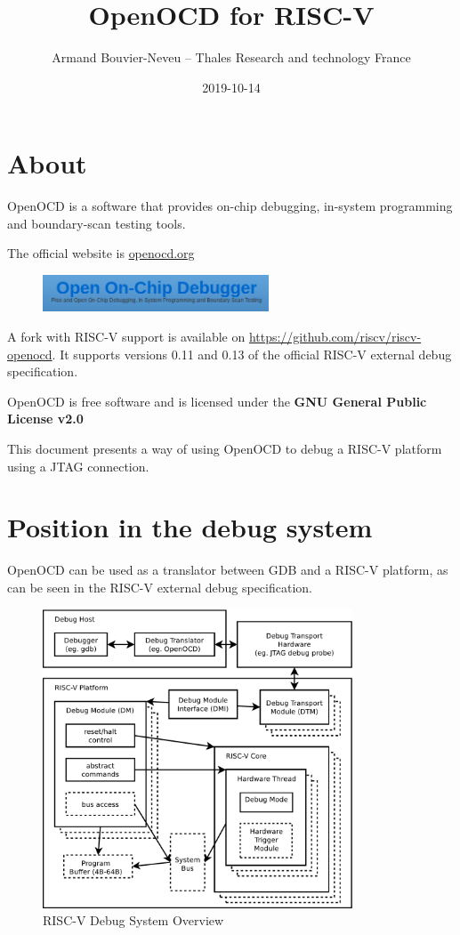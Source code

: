 \documentclass{article}
\title{OpenOCD for RISC-V}
\date{2019-10-14}
\author{Armand Bouvier-Neveu -- Thales Research and technology France}
\begin{document}
	\maketitle
	
	\section{About}
	
	OpenOCD is a software that provides on-chip debugging, in-system programming and boundary-scan testing tools.
	
	The official website is \url{openocd.org}
	
	\begin{figure}[H]
	\centering
	\includegraphics[width=0.6\textwidth]{openocd.png}
	\end{figure}
	
	A fork with RISC-V support is available on \url{https://github.com/riscv/riscv-openocd}. It supports versions 0.11 and 0.13 of the official RISC-V external debug specification.
	
	OpenOCD is free software and is licensed under the \textbf{GNU General Public License v2.0}
	
	This document presents a way of using OpenOCD to debug a RISC-V platform using a JTAG connection.
	
	
	\newpage
	\section{Position in the debug system}
	
	OpenOCD can be used as a translator between GDB and a RISC-V platform, as can be seen in the RISC-V external debug specification.
	
	\begin{figure}[H]
   	\centering
   	\includegraphics[width=0.82\textwidth]{overview.pdf}
   	\caption{RISC-V Debug System Overview}
   	\label{fig:overview}
	\end{figure}
	
\end{document}
